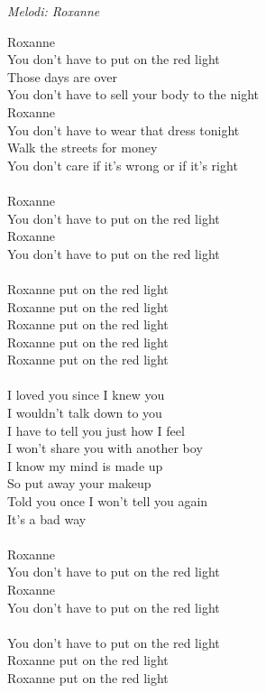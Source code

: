 {\footnotesize\textit{Melodi: Roxanne}}\par
\vspace{10pt}
Roxanne\\
You don't have to put on the red light\\
Those days are over\\
You don't have to sell your body to the night\\
Roxanne\\
You don't have to wear that dress tonight\\
Walk the streets for money\\
You don't care if it's wrong or if it's right\\
\\
Roxanne\\
You don't have to put on the red light\\
Roxanne\\
You don't have to put on the red light\\
\\
Roxanne put on the red light\\
Roxanne put on the red light\\
Roxanne put on the red light\\
Roxanne put on the red light\\
Roxanne put on the red light\\
\\
I loved you since I knew you\\
I wouldn't talk down to you\\
I have to tell you just how I feel\\
I won't share you with another boy\\
I know my mind is made up\\
So put away your makeup\\
Told you once I won't tell you again\\
It's a bad way\\
\\
Roxanne\\
You don't have to put on the red light\\
Roxanne\\
You don't have to put on the red light\\
\\
You don't have to put on the red light\\
Roxanne put on the red light\\
Roxanne put on the red light\\
